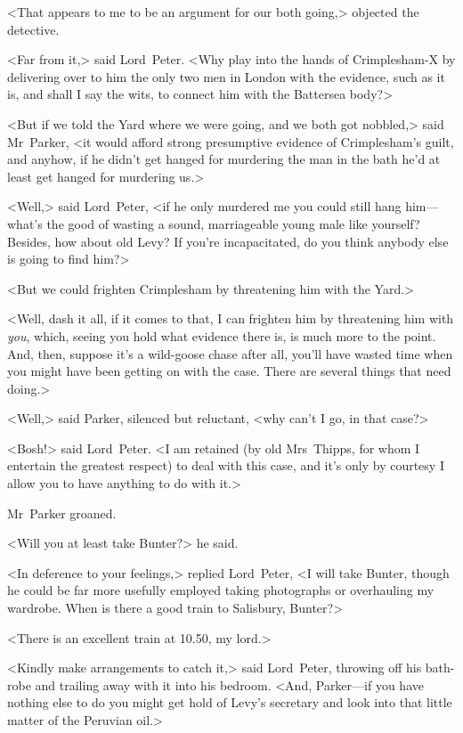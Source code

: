 <That appears to me to be an argument for our both going,> objected the detective.

<Far from it,> said Lord~Peter. <Why play into the hands of Crimplesham-X by delivering over to him the only two men in London with the evidence, such as it is, and shall I say the wits, to connect him with the Battersea body?>

<But if we told the Yard where we were going, and we both got nobbled,> said Mr~Parker, <it would afford strong presumptive evidence of Crimplesham's guilt, and anyhow, if he didn't get hanged for murdering the man in the bath he'd at least get hanged for murdering us.>

<Well,> said Lord~Peter, <if he only murdered me you could still hang him—what's the good of wasting a sound, marriageable young male like yourself? Besides, how about old Levy? If you're incapacitated, do you think anybody else is going to find him?>

<But we could frighten Crimplesham by threatening him with the Yard.>

<Well, dash it all, if it comes to that, I can frighten him by threatening him with \emph{you}, which, seeing you hold what evidence there is, is much more to the point. And, then, suppose it's a wild-goose chase after all, you'll have wasted time when you might have been getting on with the case. There are several things that need doing.>

<Well,> said Parker, silenced but reluctant, <why can't I go, in that case?>

<Bosh!> said Lord~Peter. <I am retained (by old Mrs~Thipps, for whom I entertain the greatest respect) to deal with this case, and it's only by courtesy I allow you to have anything to do with it.>

Mr~Parker groaned.

<Will you at least take Bunter?> he said.

<In deference to your feelings,> replied Lord~Peter, <I will take Bunter, though he could be far more usefully employed taking photographs or overhauling my wardrobe. When is there a good train to Salisbury, Bunter?>

<There is an excellent train at 10.50, my lord.>

<Kindly make arrangements to catch it,> said Lord~Peter, throwing off his bath-robe and trailing away with it into his bedroom. <And, Parker—if you have nothing else to do you might get hold of Levy's secretary and look into that little matter of the Peruvian oil.>

